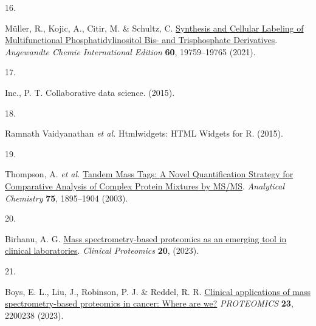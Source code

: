 \documentclass[
  letterpaper,
  DIV=11,
  numbers=noendperiod]{scrartcl}
\newlength{\cslhangindent}
\newlength{\csllabelwidth}
\newenvironment{CSLReferences}[2] %
 {\begin{list}{}{%
  \setlength{\itemindent}{0pt}
  \setlength{\leftmargin}{0pt}
  \setlength{\parsep}{0pt}
  \ifodd #1
   \setlength{\leftmargin}{\cslhangindent}
   \setlength{\itemindent}{-1\cslhangindent}
  \fi
  \setlength{\itemsep}{#2\baselineskip}}}
 {\end{list}}
\newcommand{\CSLLeftMargin}[1]{\parbox[t]{\csllabelwidth}{\strut#1\strut}}
\newcommand{\CSLRightInline}[1]{\parbox[t]{\linewidth - \csllabelwidth}{\strut#1\strut}}
\begin{document}
\begin{CSLReferences}{0}{0}
\CSLLeftMargin{16. }%
\CSLRightInline{Müller, R., Kojic, A., Citir, M. \& Schultz, C.
\href{https://doi.org/10.1002/anie.202103599}{Synthesis and {Cellular
Labeling} of {Multifunctional Phosphatidylinositol Bis}- and
{Trisphosphate Derivatives}}. \emph{Angewandte Chemie International
Edition} \textbf{60}, 19759--19765 (2021).}

\CSLLeftMargin{17. }%
\CSLRightInline{Inc., P. T. Collaborative data science. (2015).}

\CSLLeftMargin{18. }%
\CSLRightInline{Ramnath Vaidyanathan \emph{et al.} Htmlwidgets: {HTML
Widgets} for {R}. (2015).}

\CSLLeftMargin{19. }%
\CSLRightInline{Thompson, A. \emph{et al.}
\href{https://doi.org/10.1021/ac0262560}{Tandem {Mass Tags}: {A Novel
Quantification Strategy} for {Comparative Analysis} of {Complex Protein
Mixtures} by {MS}/{MS}}. \emph{Analytical Chemistry} \textbf{75},
1895--1904 (2003).}

\CSLLeftMargin{20. }%
\CSLRightInline{Birhanu, A. G.
\href{https://doi.org/10.1186/s12014-023-09424-x}{Mass
spectrometry-based proteomics as an emerging tool in clinical
laboratories}. \emph{Clinical Proteomics} \textbf{20}, (2023).}

\CSLLeftMargin{21. }%
\CSLRightInline{Boys, E. L., Liu, J., Robinson, P. J. \& Reddel, R. R.
\href{https://doi.org/10.1002/pmic.202200238}{Clinical applications of
mass spectrometry-based proteomics in cancer: {Where} are we?}
\emph{PROTEOMICS} \textbf{23}, 2200238 (2023).}

\end{CSLReferences}
\end{document}

